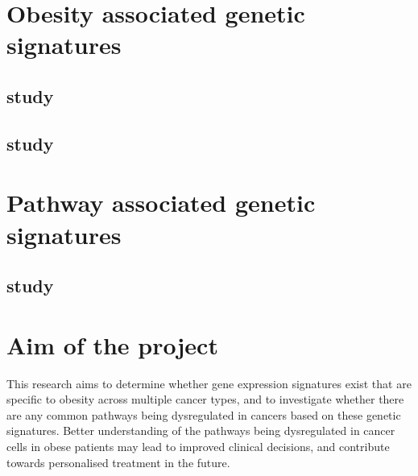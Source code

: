 \section{Obesity associated genetic signatures}
\label{sec:obesity_associated_genetic_signatures}

\subsection{\citet{Creighton2012} study}
\label{sub:creighton_study}



\subsection{\citet{Fuentes-Mattei2014} study}
\label{sub:fuentes_mattei_study}




\section{Pathway associated genetic signatures}
\label{sec:pathway_associated_genetic_signatures}


\subsection{\citep{Gatza2011} study}
\label{sub:gatza_study}





\section{Aim of the project}
\label{sec:aim}

This research aims to determine whether gene expression signatures exist  that are specific to obesity across multiple cancer types, and to investigate whether there are any common pathways being dysregulated in cancers based on these genetic signatures.
Better understanding of the pathways being dysregulated in cancer cells in obese patients may lead to improved clinical decisions, and contribute towards personalised treatment in the future.

